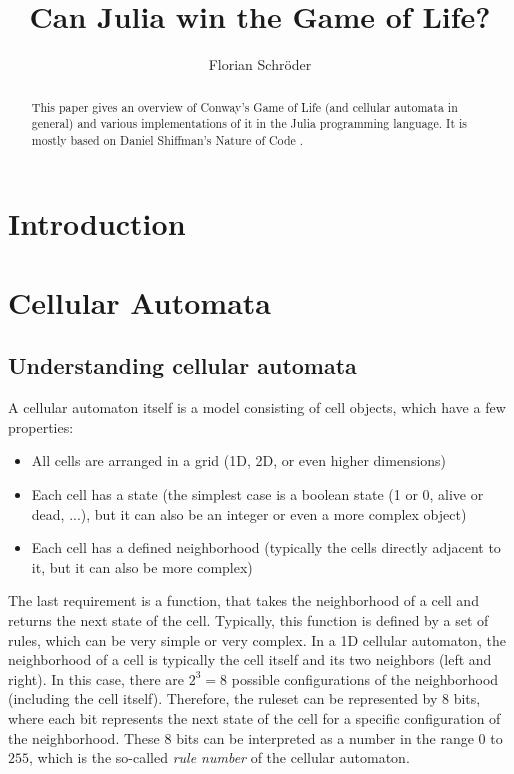 \documentclass[a4paper,12pt]{llncs}
\numberwithin{equation}{section}
\begin{document}

%
\author{Florian Schröder}
%
\title{Can Julia win the Game of Life?}
%
%
\maketitle              %
\thispagestyle{empty}
%
%
\begin{abstract}
  This paper gives an overview of Conway's Game of Life (and cellular automata in general) and various implementations of it in the Julia programming language.
  It is mostly based on Daniel Shiffman's Nature of Code \cite{NOC}.
\end{abstract}


\section{Introduction}

\section{Cellular Automata}
\subsection{Understanding cellular automata}
A cellular automaton itself is a model consisting of cell objects, which have a few properties:
\begin{itemize}
  \item All cells are arranged in a grid (1D, 2D, or even higher dimensions)
  \item Each cell has a state (the simplest case is a boolean state (1 or 0, alive or dead, ...), but it can also be an integer or even a more complex object)
  \item Each cell has a defined neighborhood (typically the cells directly adjacent to it, but it can also be more complex)
\end{itemize}
The last requirement is a function, that takes the neighborhood of a cell and returns the next state of the cell.
Typically, this function is defined by a set of rules, which can be very simple or very complex.
In a 1D cellular automaton, the neighborhood of a cell is typically the cell itself and its two neighbors (left and right).
In this case, there are $2^3=8$ possible configurations of the neighborhood (including the cell itself).
Therefore, the ruleset can be represented by 8 bits, where each bit represents the next state of the cell for a specific configuration of the neighborhood.
These 8 bits can be interpreted as a number in the range $0$ to $255$, which is the so-called \textit{rule number} of the cellular automaton.
\end{document}
